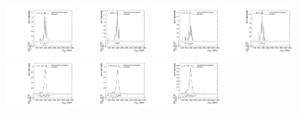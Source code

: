 \begin{figure}[htpb]
  \centering
  \includegraphics[width=0.2\textwidth]{fig/analysisAppendix/templateVsReco_VBFRadToWW2000_r0_MVV_mu_HP_bb_LDy_linear.pdf}
  \includegraphics[width=0.2\textwidth]{fig/analysisAppendix/templateVsReco_VBFRadToWW2000_r0_MVV_mu_LP_bb_LDy_linear.pdf}
  \includegraphics[width=0.2\textwidth]{fig/analysisAppendix/templateVsReco_VBFRadToWW2000_r0_MVV_mu_HP_bb_HDy_linear.pdf}
  \includegraphics[width=0.2\textwidth]{fig/analysisAppendix/templateVsReco_VBFRadToWW2000_r0_MVV_mu_LP_bb_HDy_linear.pdf}\\
  \includegraphics[width=0.2\textwidth]{fig/analysisAppendix/templateVsReco_VBFRadToWW2000_r0_MVV_mu_HP_nobb_LDy_linear.pdf}
  \includegraphics[width=0.2\textwidth]{fig/analysisAppendix/templateVsReco_VBFRadToWW2000_r0_MVV_mu_LP_nobb_LDy_linear.pdf}
  \includegraphics[width=0.2\textwidth]{fig/analysisAppendix/templateVsReco_VBFRadToWW2000_r0_MVV_mu_HP_nobb_HDy_linear.pdf}

\end{figure}
